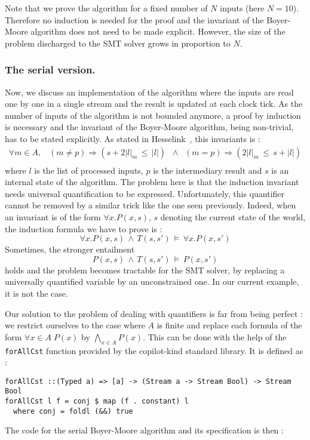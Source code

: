 Note that we prove the algorithm for a fixed number of $N$ inputs
(here $N=10$). Therefore no induction is needed for the proof and the
invariant of the Boyer-Moore algorithm does not need to be made explicit. However, the size of the problem discharged to the SMT solver grows in proportion to $N$.


\subsubsection{The serial version.} Now, we discuss an implementation
of the algorithm where the inputs are read one by one in a single
stream and the result is updated at each clock tick. As the number of
inputs of the algorithm is not bounded anymore, a proof by induction
is necessary and the invariant of the Boyer-Moore algorithm, being
non-trivial, has to be stated explicitly. As stated in  Hesselink~\cite{Hesselink2005}, this invariants is :
\[ \begin{array}{c}
\forall m \in A, \;\;\; \left(m \neq p\right) \Longrightarrow \left( s + 2|l|_m \,\leq\, |l| \right) \;\; \wedge \;\; \left(m = p\right) \Longrightarrow \left( 2|l|_m \,\leq\, s + |l| \right)
\\

\end{array} \]
where $l$ is the list of processed inputs, $p$ is the intermediary result and $s$ is an internal state of the algorithm. The problem here is that the induction invariant needs universal quantification to be expressed. Unfortunately, this quantifier cannot be removed by a similar trick like the one seen previously. Indeed, when an invariant is of the form $\forall x. P(x, s)$, $s$ denoting the current state of the world, the induction formula we have to prove is :
\[ \forall x. P(x, s) \,\wedge\, T\left(s, s' \right) \,\models\, \forall x. P(x, s') \]
Sometimes, the stronger entailment 
\[ P(x, s) \,\wedge\, T\left(s, s' \right) \,\models\, P(x, s') \]
holds and the problem becomes tractable for the SMT solver, by replacing a universally quantified variable by an unconstrained one. In our current example, it is not the case. 


Our solution to  the problem of dealing with quantifiers  is far from being perfect : we restrict ourselves
to the case where $A$ is finite and replace each formula of the form
$\forall x \in A \; P(x)$ by $\bigwedge_{x \in A} P(x)$. This can be
done with the help of the \texttt{forAllCst} function provided by the
copilot-kind standard library. It is defined as :
\begin{lstlisting}[frame=single]
forAllCst ::(Typed a) => [a] -> (Stream a -> Stream Bool) -> Stream Bool
forAllCst l f = conj $ map (f . constant) l
  where conj = foldl (&&) true
\end{lstlisting}
The code for the serial Boyer-Moore algorithm and its specification is then :

